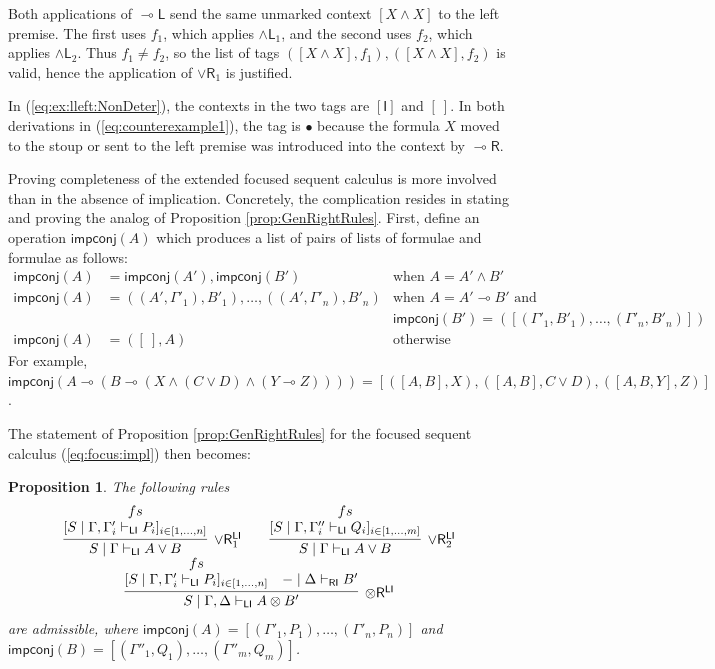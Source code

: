 \documentclass[submission,copyright,creativecommons]{eptcs}
\newtheorem{proposition}[theorem]{Proposition}
\theoremstyle{definition}
\newcommand{\tr}{\otimes \mathsf{R}}
\newcommand{\lright}{{\multimap}\mathsf{R}}
\newcommand{\lleft}{{\multimap}\mathsf{L}}
\newcommand{\andlone}{\land \mathsf{L}_{1}}
\newcommand{\andltwo}{\land \mathsf{L}_{2}}
\newcommand{\orrone}{\lor \mathsf{R}_{1}}
\newcommand{\orrtwo}{\lor \mathsf{R}_{2}}
\newcommand{\ot}{\otimes}
\newcommand{\lolli}{\multimap}
\newcommand{\I}{\mathsf{I}}
\newcommand{\RI}{\mathsf{RI}}
\newcommand{\LI}{\mathsf{LI}}
\newcommand{\impconj}[1]{\mathsf{impconj} (#1)}
\begin{document}
Both applications of $\lleft$ send the same unmarked context $[X\land X]$ to the left premise. The first uses $f_1$, which applies $\andlone$, and the second uses $f_2$, which applies $\andltwo$. Thus $f_1\ne f_2$, so the list of tags $([X\land X],f_1), ([X\land X],f_2)$ is valid, hence the application of $\orrone$ is justified.

In (\ref{eq:ex:lleft:NonDeter}), the contexts in the two tags are $[\I]$ and $[~]$. In both derivations in (\ref{eq:counterexample1}), the tag is $\bullet$ because the formula $X$ moved to the stoup or sent to the left premise was introduced into the context by $\lright$.

Proving completeness of the extended focused sequent calculus is more involved than in the absence of implication. Concretely, the complication resides in stating and proving the analog of Proposition \ref{prop:GenRightRules}. First, define an operation $\mathsf{impconj}(A)$ which produces a list of pairs of lists of formulae and formulae as follows: 
\begin{displaymath}
  \begin{array}{rll}
    \impconj{A} &= \impconj{A'} , \impconj{B'} &\text{when } A = A' \land B'
    \\
    \impconj{A} &= ((A' , \Gamma'_1) , B'_1) , \dots , ((A' , \Gamma'_n) , B'_n) &\text{when } A = A' \lolli B' \text{ and}
    \\
    & &\impconj{B'} = ([(\Gamma'_1 , B'_1) , \dots , (\Gamma'_n , B'_n)])
    \\
    \impconj{A} &= ([~] , A) &\text{otherwise}
  \end{array}
\end{displaymath}
For example, $\impconj{A \lolli (B \lolli (X \land (C \lor D) \land (Y \lolli Z)))} = [([A , B] , X) , ([A , B] , C \lor D) , ([A , B , Y] , Z)]$.

The statement of Proposition \ref{prop:GenRightRules} for the focused sequent calculus (\ref{eq:focus:impl}) then becomes:
\begin{proposition}\label{prop:GenRightRules:impl}
  The following rules
  \begin{displaymath}
    \begin{array}{c}
      \infer[\orrone^{\LI}]{S \mid \Gamma \vdash_{\LI} A \lor B}{
        \deduce{[S \mid \Gamma , \Gamma'_i \vdash_{\LI} P_i]_{i \in [1 , \dots , n]}}{fs}
      }
      \qquad
      \infer[\orrtwo^{\LI}]{S \mid \Gamma \vdash_{\LI} A \lor B}{
        \deduce{[S \mid \Gamma , \Gamma''_i \vdash_{\LI} Q_i]_{i \in [1 , \dots , m]}}{fs}
      }
      \\
      \infer[\tr^{\LI}]{S \mid \Gamma , \Delta \vdash_{\LI} A \ot B'}{
        \deduce{[S \mid \Gamma , \Gamma'_i \vdash_{\LI} P_i]_{i \in [1 , \dots , n]}}{fs}
        &
        - \mid \Delta \vdash_{\RI} B'
      }
    \end{array}
  \end{displaymath}
  are admissible, where
  $\impconj{A} = [(\Gamma'_1 , P_1) , \dots , (\Gamma'_n , P_n)]$ and $\impconj{B} = [(\Gamma''_1 , Q_1) , \dots , (\Gamma''_m , Q_m)]$.
\end{proposition}
\end{document}
